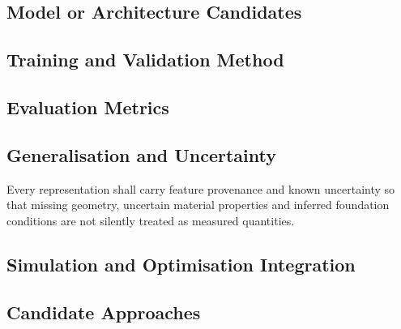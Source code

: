 
\subsection{Model or Architecture Candidates}
\label{sec:res-ml-rep-model-architecture-candidates}


\subsection{Training and Validation Method}
\label{sec:res-ml-rep-training-validation-method}


\subsection{Evaluation Metrics}
\label{sec:res-ml-rep-evaluation-metrics}


\subsection{Generalisation and Uncertainty}
\label{sec:res-ml-rep-generalisation-uncertainty}

Every representation shall carry feature provenance and known uncertainty so
that missing geometry, uncertain material properties and inferred foundation
conditions are not silently treated as measured quantities.

\subsection{Simulation and Optimisation Integration}
\label{sec:res-ml-rep-simulation-optimisation-integration}


\subsection{Candidate Approaches}
\label{sec:res-ml-rep-candidate-approaches}


